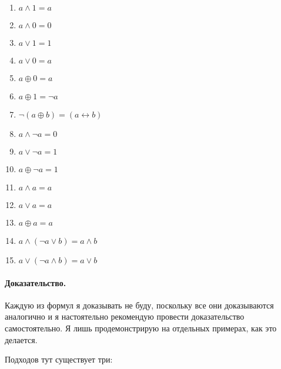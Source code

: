 \begin{enumerate}
\item $a \wedge 1 = a$
\item $a \wedge 0 = 0$
\item $a \vee 1 = 1$
\item $a \vee 0 = a$
\item $a \oplus 0 = a$
\item $a \oplus 1 = \neg a$
\item $\neg (a \oplus b) = (a \leftrightarrow b)$
\item $a \wedge \neg a = 0$
\item $a \vee \neg a = 1$
\item $a \oplus \neg a = 1$
\item $a\wedge a = a$
\item $a \vee a = a$
\item $a \oplus a = a$
\item $a \wedge (\neg a \vee b) = a \wedge b$
\item $a \vee (\neg a \wedge b) = a \vee b$
\end{enumerate}

\paragraph{Доказательство.}

Каждую из формул я доказывать не буду, поскольку все они доказываются аналогично и я настоятельно рекомендую провести доказательство самостоятельно. Я лишь продемонстрирую на отдельных примерах, как это делается.

Подходов тут существует три:

